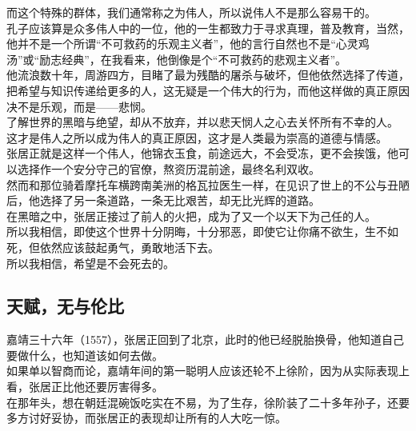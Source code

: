\begin{multicols}{\theparacolNo}
而这个特殊的群体，我们通常称之为伟人，所以说伟人不是那么容易干的。\\

孔子应该算是众多伟人中的一位，他的一生都致力于寻求真理，普及教育，当然，他并不是一个所谓“不可救药的乐观主义者”，他的言行自然也不是“心灵鸡汤”或“励志经典”，在我看来，他倒像是个“不可救药的悲观主义者”。\\

他流浪数十年，周游四方，目睹了最为残酷的屠杀与破坏，但他依然选择了传道，把希望与知识传递给更多的人，这无疑是一个伟大的行为，而他这样做的真正原因决不是乐观，而是——悲悯。\\

了解世界的黑暗与绝望，却从不放弃，并以悲天悯人之心去关怀所有不幸的人。\\

这才是伟人之所以成为伟人的真正原因，这才是人类最为崇高的道德与情感。\\

张居正就是这样一个伟人，他锦衣玉食，前途远大，不会受冻，更不会挨饿，他可以选择作一个安分守己的官僚，熬资历混前途，最终名利双收。\\

然而和那位骑着摩托车横跨南美洲的格瓦拉医生一样，在见识了世上的不公与丑陋后，他选择了另一条道路，一条无比艰苦，却无比光辉的道路。\\

在黑暗之中，张居正接过了前人的火把，成为了又一个以天下为己任的人。\\

所以我相信，即使这个世界十分阴晦，十分邪恶，即使它让你痛不欲生，生不如死，但依然应该鼓起勇气，勇敢地活下去。\\

所以我相信，希望是不会死去的。\\

\subsection{天赋，无与伦比}
嘉靖三十六年（1557），张居正回到了北京，此时的他已经脱胎换骨，他知道自己要做什么，也知道该如何去做。\\

如果单以智商而论，嘉靖年间的第一聪明人应该还轮不上徐阶，因为从实际表现上看，张居正比他还要厉害得多。\\

在那年头，想在朝廷混碗饭吃实在不易，为了生存，徐阶装了二十多年孙子，还要多方讨好妥协，而张居正的表现却让所有的人大吃一惊。\\


\end{multicols}
